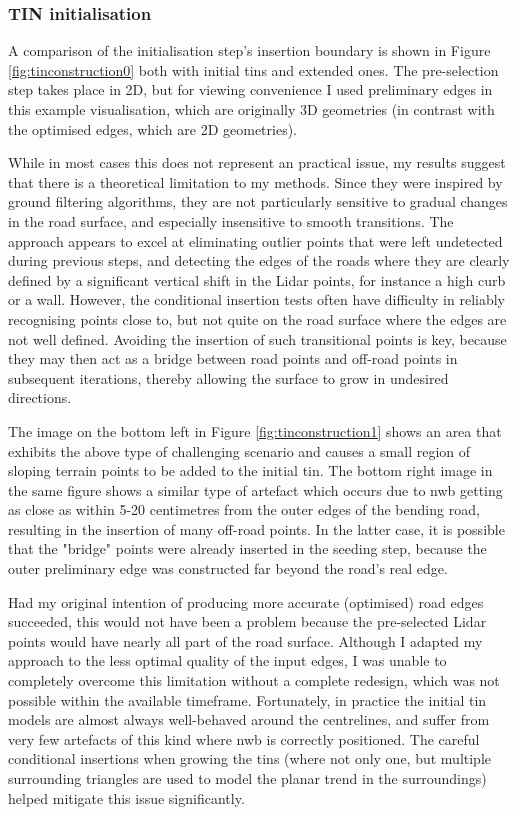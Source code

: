 \subsubsection{TIN initialisation}

A comparison of the initialisation step's insertion boundary is shown in Figure \ref{fig:tinconstruction0} both with initial \ac{tin}s and extended ones. The pre-selection step takes place in 2D, but for viewing convenience I used preliminary edges in this example visualisation, which are originally 3D geometries (in contrast with the optimised edges, which are 2D geometries).

While in most cases this does not represent an practical issue, my results suggest that there is a theoretical limitation to my methods. Since they were inspired by ground filtering algorithms, they are not particularly sensitive to gradual changes in the road surface, and especially insensitive to smooth transitions. The approach appears to excel at eliminating outlier points that were left undetected during previous steps, and detecting the edges of the roads where they are clearly defined by a significant vertical shift in the Lidar points, for instance a high curb or a wall. However, the conditional insertion tests often have difficulty in reliably recognising points close to, but not quite on the road surface where the edges are not well defined. Avoiding the insertion of such transitional points is key, because they may then act as a bridge between road points and off-road points in subsequent iterations, thereby allowing the surface to grow in undesired directions.

The image on the bottom left in Figure \ref{fig:tinconstruction1} shows an area that exhibits the above type of challenging scenario and causes a small region of sloping terrain points to be added to the initial \ac{tin}. The bottom right image in the same figure shows a similar type of artefact which occurs due to \ac{nwb} getting as close as within 5-20 centimetres from the outer edges of the bending road, resulting in the insertion of many off-road points. In the latter case, it is possible that the "bridge" points were already inserted in the seeding step, because the outer preliminary edge was constructed far beyond the road's real edge.

Had my original intention of producing more accurate (optimised) road edges succeeded, this would not have been a problem because the pre-selected Lidar points would have nearly all part of the road surface. Although I adapted my approach to the less optimal quality of the input edges, I was unable to completely overcome this limitation without a complete redesign, which was not possible within the available timeframe. Fortunately, in practice the initial \ac{tin} models are almost always well-behaved around the centrelines, and suffer from very few artefacts of this kind where \ac{nwb} is correctly positioned. The careful conditional insertions when growing the \ac{tin}s (where not only one, but multiple surrounding triangles are used to model the planar trend in the surroundings) helped mitigate this issue significantly.

